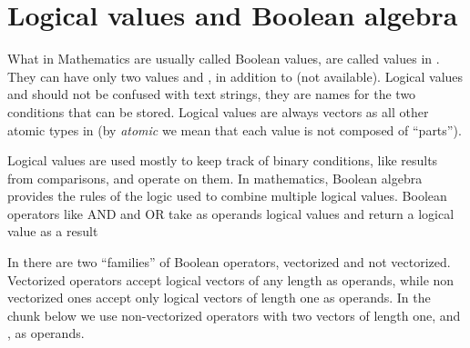 \documentclass[krantz2]{krantz}\usepackage{knitr}
\begin{document}
\section{Logical values and Boolean algebra}\label{sec:calc:boolean}
What in Mathematics are usually called Boolean values, are called  values in \Rlang. They can have only two values  and , in addition to  (not available). Logical values  and  should not be confused with text strings, they are names for the two conditions that can be stored. Logical values are always vectors as all other atomic types in \Rlang (by \emph{atomic} we mean that each value is not composed of ``parts'').

Logical values are used mostly to keep track of binary conditions, like results from comparisons, and operate on them. In mathematics, Boolean algebra provides the rules of the logic used to combine multiple logical values. Boolean operators like AND and OR take as operands logical values and return a logical value as a result

In \Rlang there are two ``families'' of Boolean operators, vectorized and not vectorized. Vectorized operators accept logical vectors of any length as operands, while non vectorized ones accept only logical vectors of length one as operands. In the chunk below we use non-vectorized operators with two  vectors of length one,  and , as operands.
\end{document}
